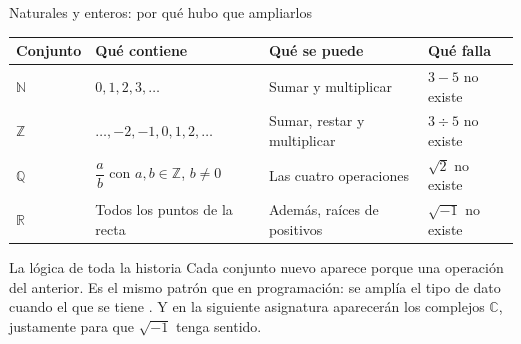\documentclass[aspectratio=169,10pt]{beamer}
\begin{document}
\begin{frame}{Naturales y enteros: por qué hubo que ampliarlos}
  \scriptsize
  \begin{center}
  \begin{tabular}{@{}p{1.6cm}p{3.6cm}p{3.0cm}p{3.4cm}@{}}
    \toprule
    \textbf{Conjunto} & \textbf{Qué contiene} & \textbf{Qué se puede} &
    \textbf{Qué falla} \\
    \midrule
    $\mathbb{N}$ & $0, 1, 2, 3, \dots$ &
      Sumar y multiplicar & $3 - 5$ no existe \\
    \addlinespace
    $\mathbb{Z}$ & $\dots, -2, -1, 0, 1, 2, \dots$ &
      Sumar, restar y multiplicar & $3 \div 5$ no existe \\
    \addlinespace
    $\mathbb{Q}$ & $\dfrac{a}{b}$ con $a,b \in \mathbb{Z}$, $b \ne 0$ &
      Las cuatro operaciones & $\sqrt{2}$ no existe \\
    \addlinespace
    $\mathbb{R}$ & Todos los puntos de la recta &
      Además, raíces de positivos & $\sqrt{-1}$ no existe \\
    \bottomrule
  \end{tabular}
  \end{center}

  \vspace{0.1cm}
  \begin{alertblock}{La lógica de toda la historia}
    \scriptsize
    Cada conjunto nuevo aparece porque una operación  del
    anterior. Es el mismo patrón que en programación: se amplía el tipo de dato
    cuando el que se tiene . Y en la siguiente asignatura
    aparecerán los complejos $\mathbb{C}$, justamente para que $\sqrt{-1}$
    tenga sentido.
  \end{alertblock}
\end{frame}
\end{document}
